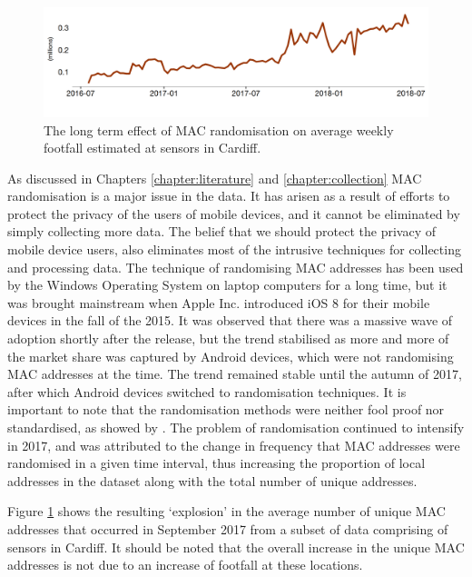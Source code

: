 \begin{figure}
  \includegraphics[trim={0 0 0 0},clip]{images/processing-error-randomisation.png}
  \caption{The long term effect of MAC randomisation on average weekly footfall estimated at sensors in Cardiff.}
  \label{figure:processing:error:random}
\end{figure}

As discussed in Chapters \ref{chapter:literature} and \ref{chapter:collection} MAC randomisation is a major issue in the data.
It has arisen as a result of efforts to protect the privacy of the users of mobile devices, and it cannot be eliminated by simply collecting more data.
The belief that we should protect the privacy of mobile device users, also eliminates most of the intrusive techniques for collecting and processing data.
The technique of randomising MAC addresses has been used by the Windows Operating System on laptop computers for a long time, but it was brought mainstream when Apple Inc. introduced iOS 8 for their mobile devices in the fall of the 2015.
It was observed that there was a massive wave of adoption shortly after the release, but the trend stabilised as more and more of the market share was captured by Android devices, which were not randomising MAC addresses at the time.
The trend remained stable until the autumn of 2017, after which Android devices switched to randomisation techniques.
It is important to note that the randomisation methods were neither fool proof nor standardised, as showed by \citep{vanhoef2016}.
The problem of randomisation continued to intensify in 2017, and was attributed to the change in frequency that MAC addresses were randomised in a given time interval, thus increasing the proportion of local addresses in the dataset along with the total number of unique addresses.

Figure \ref{figure:processing:error:random} shows the resulting ‘explosion’ in the average number of unique MAC addresses that occurred in September 2017 from a subset of data comprising of sensors in Cardiff.
It should be noted that the overall increase in the unique MAC addresses is not due to an increase of footfall at these locations.

